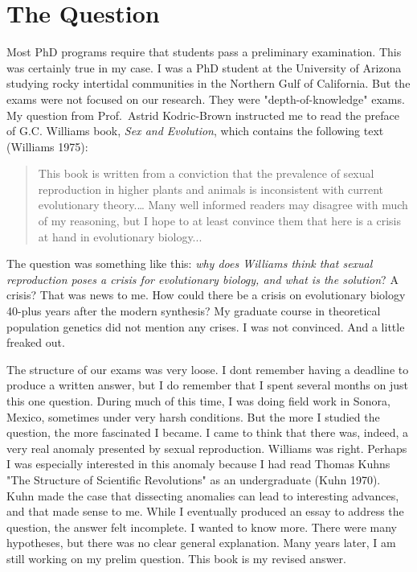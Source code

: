 \documentclass[
  11pt,
  letterpaper,
]{scrbook}
\begin{document}
\hypertarget{the-question}{%
\section{The Question}\label{the-question}}

Most PhD programs require that students pass a preliminary examination.
This was certainly true in my case. I was a PhD student at the
University of Arizona studying rocky intertidal communities in the
Northern Gulf of California. But the exams were not focused on our
research. They were "depth-of-knowledge" exams. My question from
Prof.~Astrid Kodric-Brown instructed me to read the preface of G.C.
Williams\textquotesingle{} book, \emph{Sex and Evolution}, which
contains the following text (Williams 1975):

\begin{quote}
This book is written from a conviction that the prevalence of sexual
reproduction in higher plants and animals is inconsistent with current
evolutionary theory.\ldots{} Many well informed readers may disagree
with much of my reasoning, but I hope to at least convince them that
here is a crisis at hand in evolutionary biology...
\end{quote}

The question was something like this: \emph{why does Williams think that
sexual reproduction poses a crisis for evolutionary biology, and what is
the solution}? A crisis? That was news to me. How could there be a
crisis on evolutionary biology 40-plus years after the modern synthesis?
My graduate course in theoretical population genetics did not mention
any crises. I was not convinced. And a little freaked out.

The structure of our exams was very loose. I don\textquotesingle t
remember having a deadline to produce a written answer, but I do
remember that I spent several months on just this one question. During
much of this time, I was doing field work in Sonora, Mexico, sometimes
under very harsh conditions. But the more I studied the question, the
more fascinated I became. I came to think that there was, indeed, a very
real anomaly presented by sexual reproduction. Williams was right.
Perhaps I was especially interested in this anomaly because I had read
Thomas Kuhn\textquotesingle s "The Structure of Scientific Revolutions"
as an undergraduate (Kuhn 1970). Kuhn made the case that dissecting
anomalies can lead to interesting advances, and that made sense to me.
While I eventually produced an essay to address the question, the answer
felt incomplete. I wanted to know more. There were many hypotheses, but
there was no clear general explanation. Many years later, I am still
working on my prelim question. This book is my revised answer.
\end{document}
